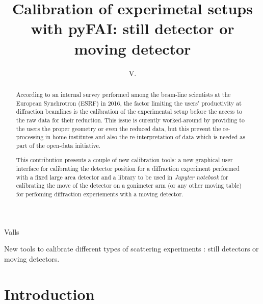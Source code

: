 \documentclass[preprint]{iucr}              %
\begin{document}

\title{Calibration of experimetal setups with {pyFAI}: still detector or
moving detector}

 \author[a]{V.}{Valls}
 
 





\maketitle                        %

\begin{synopsis}
New tools to calibrate different types of scattering experiments : still
detectors or moving detectors.
\end{synopsis}

\begin{abstract}

According to an internal survey performed among the beam-line scientists at
the European Synchrotron (ESRF) in 2016, the factor limiting the users'
productivity at diffraction beamlines is the calibration of the experimental
setup before the access to the raw data for their reduction. 
This issue is curently worked-around by providing to the users the proper
geometry or even the reduced data, but this prevent the
re-processing in home institutes and also the re-interpretation of data which
is needed as part of the open-data initiative.

This contribution presents a couple of new calibration tools: 
a new graphical user interface for calibrating the detector position for a 
diffraction experiment performed with a fixed large area detector and a library
to be used in \textit{Jupyter notebook} for calibrating the move of the
detector on a gonimeter arm (or any other moving table) for perfoming
diffraction experiements with a moving detector.
\end{abstract}


\section{Introduction}
\end{document}
